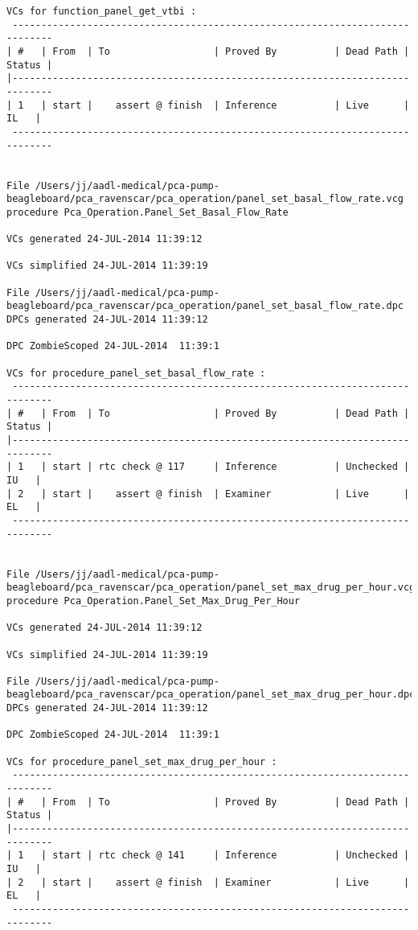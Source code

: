 \begin{lstlisting}[frame=single, gobble=0, caption={POGS report for PCA Pump prototype}]
VCs for function_panel_get_vtbi :
 -----------------------------------------------------------------------------
| #   | From  | To                  | Proved By          | Dead Path | Status |
|-----------------------------------------------------------------------------
| 1   | start |    assert @ finish  | Inference          | Live      |   IL   |
 -----------------------------------------------------------------------------


File /Users/jj/aadl-medical/pca-pump-beagleboard/pca_ravenscar/pca_operation/panel_set_basal_flow_rate.vcg
procedure Pca_Operation.Panel_Set_Basal_Flow_Rate

VCs generated 24-JUL-2014 11:39:12

VCs simplified 24-JUL-2014 11:39:19

File /Users/jj/aadl-medical/pca-pump-beagleboard/pca_ravenscar/pca_operation/panel_set_basal_flow_rate.dpc
DPCs generated 24-JUL-2014 11:39:12

DPC ZombieScoped 24-JUL-2014  11:39:1

VCs for procedure_panel_set_basal_flow_rate :
 -----------------------------------------------------------------------------
| #   | From  | To                  | Proved By          | Dead Path | Status |
|-----------------------------------------------------------------------------
| 1   | start | rtc check @ 117     | Inference          | Unchecked |   IU   |
| 2   | start |    assert @ finish  | Examiner           | Live      |   EL   |
 -----------------------------------------------------------------------------


File /Users/jj/aadl-medical/pca-pump-beagleboard/pca_ravenscar/pca_operation/panel_set_max_drug_per_hour.vcg
procedure Pca_Operation.Panel_Set_Max_Drug_Per_Hour

VCs generated 24-JUL-2014 11:39:12

VCs simplified 24-JUL-2014 11:39:19

File /Users/jj/aadl-medical/pca-pump-beagleboard/pca_ravenscar/pca_operation/panel_set_max_drug_per_hour.dpc
DPCs generated 24-JUL-2014 11:39:12

DPC ZombieScoped 24-JUL-2014  11:39:1

VCs for procedure_panel_set_max_drug_per_hour :
 -----------------------------------------------------------------------------
| #   | From  | To                  | Proved By          | Dead Path | Status |
|-----------------------------------------------------------------------------
| 1   | start | rtc check @ 141     | Inference          | Unchecked |   IU   |
| 2   | start |    assert @ finish  | Examiner           | Live      |   EL   |
 -----------------------------------------------------------------------------



\end{lstlisting}
